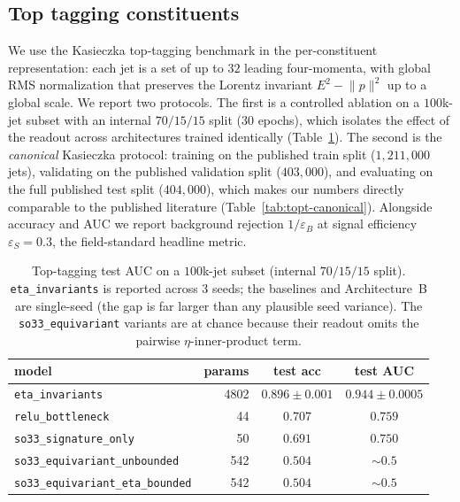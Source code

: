 \documentclass[11pt]{article}
\begin{document}
\subsection{Top tagging constituents}
\label{sec:exp-tt}

We use the Kasieczka top-tagging benchmark in the per-constituent
representation: each jet is a set of up to $32$ leading four-momenta,
with global RMS normalization that preserves the Lorentz invariant
$E^2 - \lVert p\rVert^2$ up to a global scale. We report two protocols.
The first is a controlled ablation on a $100$k-jet subset with an
internal $70/15/15$ split ($30$ epochs), which isolates the effect of
the readout across architectures trained identically
(Table~\ref{tab:topt}). The second is the \emph{canonical} Kasieczka
protocol: training on the published train split ($1{,}211{,}000$ jets),
validating on the published validation split ($403{,}000$), and
evaluating on the full published test split ($404{,}000$), which makes
our numbers directly comparable to the published literature
(Table~\ref{tab:topt-canonical}). Alongside accuracy and AUC we report
background rejection $1/\varepsilon_B$ at signal efficiency
$\varepsilon_S = 0.3$, the field-standard headline metric.

\begin{table}[t]
  \centering
  \caption{Top-tagging test AUC on a $100$k-jet subset (internal
    $70/15/15$ split). \texttt{eta\_invariants} is reported across $3$
    seeds; the baselines and Architecture~B are single-seed (the gap
    is far larger than any plausible seed variance). The
    \texttt{so33\_equivariant} variants are at chance because their
    readout omits the pairwise $\eta$-inner-product term.}
  \label{tab:topt}
  \begin{tabular}{lrcc}
    \toprule
    model & params & test acc & test AUC \\
    \midrule
    \texttt{eta\_invariants}                  & 4802 & $0.896\pm 0.001$ & $\mathbf{0.944\pm 0.0005}$ \\
    \midrule
    \texttt{relu\_bottleneck}                 & 44   & $0.707$ & $0.759$ \\
    \texttt{so33\_signature\_only}            & 50   & $0.691$ & $0.750$ \\
    \midrule
    \texttt{so33\_equivariant\_unbounded}     & 542  & $0.504$ & $\sim 0.5$ \\
    \texttt{so33\_equivariant\_eta\_bounded}  & 542  & $0.504$ & $\sim 0.5$ \\
    \bottomrule
  \end{tabular}
\end{table}
\end{document}
